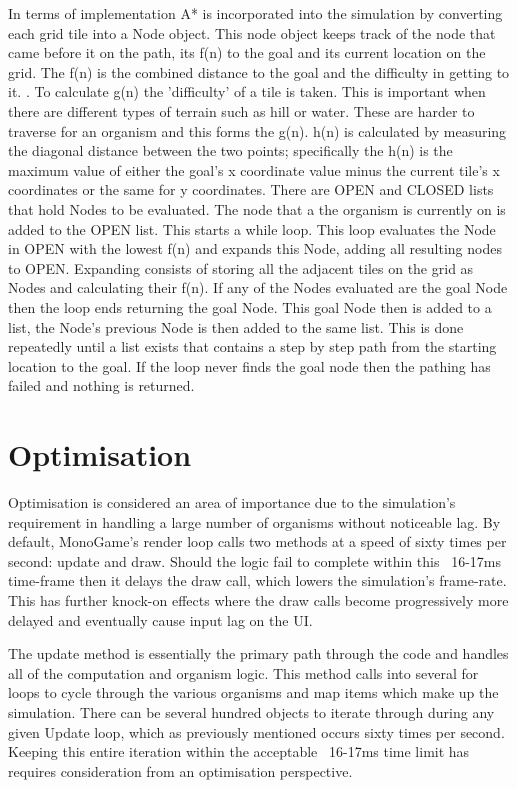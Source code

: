 \documentclass[a4paper, oneside, 11pt]{report}
\begin{document}
In terms of implementation A* is incorporated into the simulation by converting each grid tile into a Node object. This node object keeps track of the node that came before it on the path, its f(n) to the goal and its current location on the grid. The f(n) is the combined distance to the goal and the difficulty in getting to it.
. 
To calculate g(n) the 'difficulty' of a tile is taken. This is important when there are different types of terrain such as hill or water. These are harder to traverse for an organism and this forms the g(n). h(n) is calculated by measuring the diagonal distance between the two points; specifically the h(n) is the maximum value of either the goal's x coordinate value minus the current tile's x coordinates or the same for y coordinates.
There are OPEN and CLOSED lists that hold Nodes to be evaluated. The node that a the organism is currently on is added to the OPEN list. This starts a while loop. This loop evaluates the Node in OPEN with the lowest f(n) and expands this Node, adding all resulting nodes to OPEN. Expanding consists of storing all the adjacent tiles on the grid as Nodes and calculating their f(n). If any of the Nodes evaluated are the goal Node then the loop ends returning the goal Node. This goal Node then is added to a list, the Node's previous Node is then added to the same list. This is done repeatedly until a list exists that contains a step by step path from the starting location to the goal. If the loop never finds the goal node then the pathing has failed and nothing is returned. 

\section{Optimisation}\label{optim}
Optimisation is considered an area of importance due to the simulation's requirement in handling a large number of organisms without noticeable lag. By default, MonoGame's render loop calls two methods at a speed of sixty times per second: update and draw. Should the logic fail to complete within this ~16-17ms time-frame then it delays the draw call, which lowers the simulation's frame-rate. This has further knock-on effects where the draw calls become progressively more delayed and eventually cause input lag on the UI.

The update method is essentially the primary path through the code and handles all of the computation and organism logic. This method calls into several for loops to cycle through the various organisms and map items which make up the simulation. There can be several hundred objects to iterate through during any given Update loop, which as previously mentioned occurs sixty times per second. Keeping this entire iteration within the acceptable ~16-17ms time limit has requires consideration from an optimisation perspective.
\end{document}
